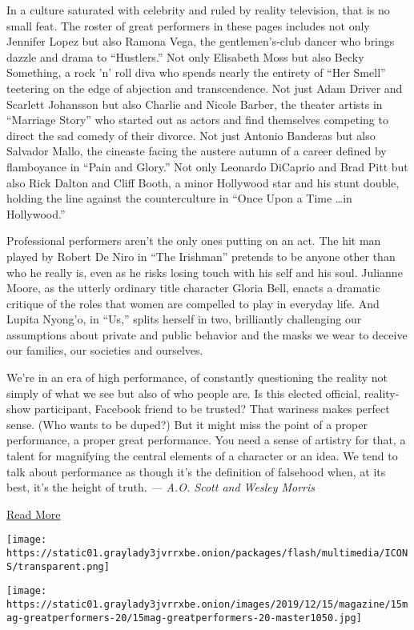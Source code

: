 In a culture saturated with celebrity and ruled by reality television,
that is no small feat. The roster of great performers in these pages
includes not only Jennifer Lopez but also Ramona Vega, the
gentlemen's-club dancer who brings dazzle and drama to ``Hustlers.'' Not
only Elisabeth Moss but also Becky Something, a rock 'n' roll diva who
spends nearly the entirety of ``Her Smell'' teetering on the edge of
abjection and transcendence. Not just Adam Driver and Scarlett Johansson
but also Charlie and Nicole Barber, the theater artists in ``Marriage
Story'' who started out as actors and find themselves competing to
direct the sad comedy of their divorce. Not just Antonio Banderas but
also Salvador Mallo, the cineaste facing the austere autumn of a career
defined by flamboyance in ``Pain and Glory.'' Not only Leonardo DiCaprio
and Brad Pitt but also Rick Dalton and Cliff Booth, a minor Hollywood
star and his stunt double, holding the line against the counterculture
in ``Once Upon a Time \ldots{}in Hollywood.''

Professional performers aren't the only ones putting on an act. The hit
man played by Robert De Niro in ``The Irishman'' pretends to be anyone
other than who he really is, even as he risks losing touch with his self
and his soul. Julianne Moore, as the utterly ordinary title character
Gloria Bell, enacts a dramatic critique of the roles that women are
compelled to play in everyday life. And Lupita Nyong'o, in ``Us,''
splits herself in two, brilliantly challenging our assumptions about
private and public behavior and the masks we wear to deceive our
families, our societies and ourselves.

We're in an era of high performance, of constantly questioning the
reality not simply of what we see but also of who people are. Is this
elected official, reality-show participant, Facebook friend to be
trusted? That wariness makes perfect sense. (Who wants to be duped?) But
it might miss the point of a proper performance, a proper great
performance. You need a sense of artistry for that, a talent for
magnifying the central elements of a character or an idea. We tend to
talk about performance as though it's the definition of falsehood when,
at its best, it's the height of truth. \emph{--- A.O. Scott and Wesley
Morris}

\protect\hyperlink{}{Read More}

\texttt{[image: https://static01.graylady3jvrrxbe.onion/packages/flash/multimedia/ICONS/transparent.png]}

\texttt{[image: https://static01.graylady3jvrrxbe.onion/images/2019/12/15/magazine/15mag-greatperformers-20/15mag-greatperformers-20-master1050.jpg]}

